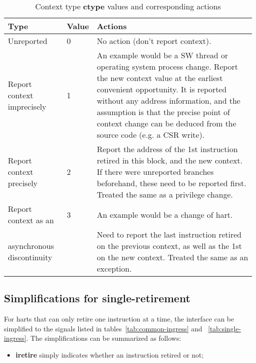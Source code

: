 \begin{table}[htp]
    \centering
    \caption{Context type \textbf{ctype} values and corresponding actions}
    \label{tab:context-type}
    \begin{tabulary}{\textwidth}{|l|l|p{90mm}|}
        \hline
        \textbf{Type} & \textbf{Value} & \textbf{Actions} \\
        \hline
        Unreported & 0 & No action (don't report context).\\
        \hline
        Report context imprecisely & 1 & An example would be a SW thread or operating system process change.\newline
        Report the new context value at the earliest convenient opportunity.\newline
        It is reported without any address information, and the assumption is that the precise 
        point of context change can be deduced from the source code (e.g. a CSR write). \\
        \hline
        Report context precisely  & 2 & Report the address of the 1st instruction retired in this block, and the new context.\newline
        If there were unreported branches beforehand, these need to be reported first.\newline
        Treated the same as a privilege change.\\
        \hline
        Report context as an & 3 &  An example would be a change of hart.\\
        asynchronous discontinuity & & 
        Need to report the last instruction retired on the previous context, as well as the 1st on the new context.\newline
        Treated the same as an exception.\\
        \hline
    \end{tabulary}
\end{table}

\subsection{Simplifications for single-retirement} \label{sec:single-retire}

For harts that can only retire one instruction at a time, the interface can be simplified to
the signals listed in tables~\ref{tab:common-ingress} and ~\ref{tab:single-ingress}.  The 
simplifications can be summarized as follows:
 
\begin{itemize}
  \item \textbf{iretire} simply indicates whether an instruction retired or not;
\end{itemize}

